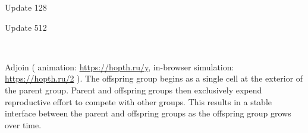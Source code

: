 \begin{figure*}[!htbp]
\begin{center}
\begin{minipage}[b]{\textwidth}
\begin{minipage}[t]{0.18\textwidth}
{\footnotesize Update 128}
\end{minipage}
\begin{minipage}[t]{0.18\textwidth}
\centering
{}
{\footnotesize Update 512}
\end{minipage}\\
\begin{minipage}{\textwidth}
\dissertationonly{\footnotesize}
Adjoin
(%
animation: \url{https://hopth.ru/y},
in-browser simulation: \url{https://hopth.ru/2}%
).
The offspring group begins as a single cell at the exterior of the parent group.
Parent and offspring groups then exclusively expend reproductive effort to compete with other groups.
This results in a stable interface between the parent and offspring groups as the offspring group grows over time.
\end{minipage}
\end{minipage}

\vspace{3ex}


\end{center}
\end{figure*}
